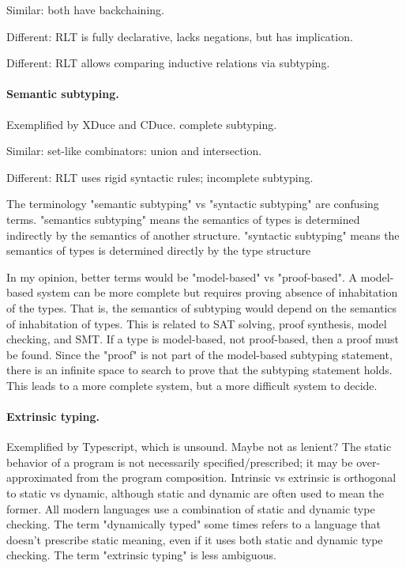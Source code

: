 \documentclass[acmsmall]{acmart}
\begin{document}
Similar: both have backchaining. 

Different: RLT is fully declarative, lacks negations, but has implication. 

Different: RLT allows comparing inductive relations via subtyping. 

\paragraph{Semantic subtyping.} 
Exemplified by XDuce and CDuce. complete subtyping.

Similar: set-like combinators: union and intersection.

Different: RLT uses rigid syntactic rules; incomplete subtyping.

The terminology "semantic subtyping" vs "syntactic subtyping" are confusing terms. 
"semantics subtyping" means the semantics of types is determined indirectly by the semantics of another structure.
"syntactic subtyping" means the semantics of types is determined directly by the type structure

In my opinion, better terms would be "model-based" vs "proof-based".
A model-based system can be more complete but requires proving absence of inhabitation of the types.
That is, the semantics of subtyping would depend on the semantics of inhabitation of types.
This is related to SAT solving, proof synthesis, model checking, and SMT.
If a type is model-based, not proof-based, then a proof must be found.
Since the "proof" is not part of the model-based subtyping statement, 
there is an infinite space to search to prove that the subtyping statement holds.
This leads to a more complete system, but a more difficult system to decide.

\paragraph{Extrinsic typing.}
Exemplified by Typescript, which is unsound. Maybe not as lenient?  
The static behavior of a program is not necessarily specified/prescribed; 
it may be over-approximated from the program composition. 
Intrinsic vs extrinsic is orthogonal to static vs dynamic, although static and dynamic are often used to mean the former.
All modern languages use a combination of static and dynamic type checking.
The term "dynamically typed" some times refers to a language that doesn't prescribe static meaning,
even if it uses both static and dynamic type checking. The term "extrinsic typing" is less ambiguous.
\end{document}

